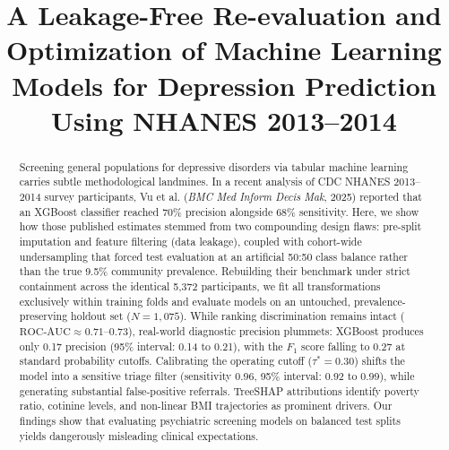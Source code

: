 \documentclass[conference]{IEEEtran}
\begin{document}
\title{\LARGE\bfseries A Leakage-Free Re-evaluation and Optimization of Machine Learning Models for Depression Prediction Using NHANES 2013--2014}

\author{
  \and
  \and
}

\maketitle

\begin{abstract}
Screening general populations for depressive disorders via tabular machine learning carries subtle methodological landmines. In a recent analysis of CDC NHANES 2013--2014 survey participants, Vu et al. (\textit{BMC Med Inform Decis Mak}, 2025) reported that an XGBoost classifier reached 70\% precision alongside 68\% sensitivity. Here, we show how those published estimates stemmed from two compounding design flaws: pre-split imputation and feature filtering (data leakage), coupled with cohort-wide undersampling that forced test evaluation at an artificial 50:50 class balance rather than the true 9.5\% community prevalence. Rebuilding their benchmark under strict containment across the identical 5,372 participants, we fit all transformations exclusively within training folds and evaluate models on an untouched, prevalence-preserving holdout set ($N = 1,075$). While ranking discrimination remains intact ($\text{ROC-AUC} \approx 0.71$--$0.73$), real-world diagnostic precision plummets: XGBoost produces only 0.17 precision (95\% interval: 0.14 to 0.21), with the $F_1$ score falling to 0.27 at standard probability cutoffs. Calibrating the operating cutoff ($\tau^* = 0.30$) shifts the model into a sensitive triage filter (sensitivity 0.96, 95\% interval: 0.92 to 0.99), while generating substantial false-positive referrals. TreeSHAP attributions identify poverty ratio, cotinine levels, and non-linear BMI trajectories as prominent drivers. Our findings show that evaluating psychiatric screening models on balanced test splits yields dangerously misleading clinical expectations.
\end{abstract}
\end{document}
